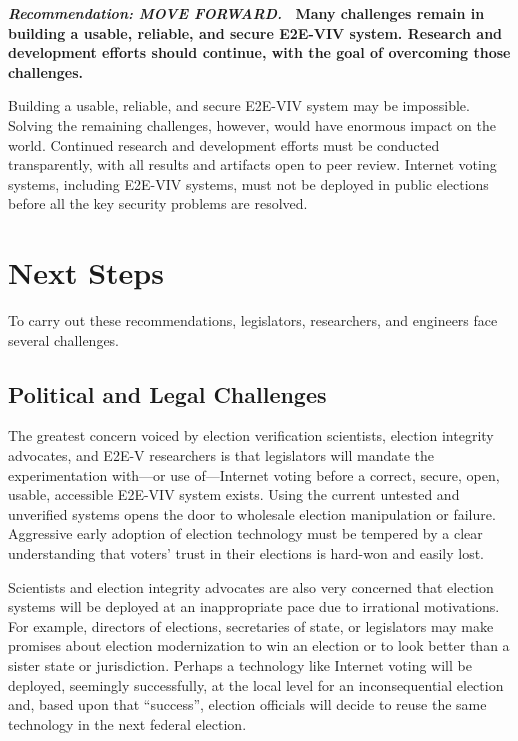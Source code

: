 \vspace{12pt} 

\textbf{\emph{Recommendation: MOVE FORWARD.} \ Many challenges remain
  in building a usable, reliable, and secure E2E-VIV system. Research
  and development efforts should continue, with the goal of overcoming
  those challenges.}

Building a usable, reliable, and secure E2E-VIV system may be
impossible. Solving the remaining challenges, however, would have
enormous impact on the world. Continued research and development
efforts must be conducted transparently, with all results and
artifacts open to peer review. Internet voting systems, including
E2E-VIV systems, must not be deployed in public elections before all
the key security problems are resolved.

\section{Next Steps}
\label{sec:next-steps}

To carry out these recommendations, legislators, researchers, and
engineers face several challenges.

\subsection{Political and Legal Challenges}

The greatest concern voiced by election verification scientists,
election integrity advocates, and E2E-V researchers is that
legislators will mandate the experimentation with---or use
of---Internet voting before a correct, secure, open, usable,
accessible E2E-VIV system exists. Using the current untested and
unverified systems opens the door to wholesale election manipulation
or failure. Aggressive early adoption of election technology must be
tempered by a clear understanding that voters' trust in their
elections is hard-won and easily lost.

Scientists and election integrity advocates are also very concerned
that election systems will be deployed at an inappropriate pace due to
irrational motivations. For example, directors of elections,
secretaries of state, or legislators may make promises about election
modernization to win an election or to look better than a sister state
or jurisdiction. Perhaps a technology like Internet voting will be
deployed, seemingly successfully, at the local level for an
inconsequential election and, based upon that ``success'', election
officials will decide to reuse the same technology in the next federal
election.

